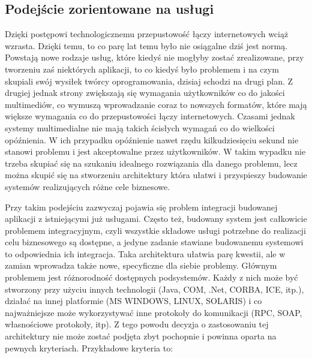 \subsection {Podejście zorientowane na usługi}
Dzięki postępowi technologicznemu przepustowość łączy internetowych wciąż wzrasta. Dzięki temu, to co parę lat temu było nie osiągalne dziś jest normą. Powstają nowe rodzaje usług, które kiedyś nie mogłyby zostać zrealizowane, przy tworzeniu zaś niektórych aplikacji, to co kiedyś było problemem i na czym skupiali swój wysiłek twórcy oprogramowania, dzisiaj schodzi na drugi plan. Z drugiej jednak strony zwiększają się wymagania użytkowników co do jakości multimediów, co wymuszą wprowadzanie coraz to nowszych formatów, które mają większe wymagania co do przepustowości łączy internetowych. Czasami jednak systemy multimedialne nie mają takich ścisłych wymagań co do wielkości opóźnienia. W ich przypadku opóźnienie nawet rzędu kilkudziesięciu sekund nie stanowi problemu i jest akceptowalne przez użytkowników. W takim wypadku nie trzeba skupiać się na szukaniu idealnego rozwiązania dla danego problemu, lecz można skupić się na stworzeniu architektury która ułatwi i przyspieszy budowanie systemów realizujących różne cele biznesowe.

Przy takim podejściu zazwyczaj pojawia się problem integracji budowanej aplikacji z istniejącymi już usługami. Często też, budowany system jest całkowicie problemem integracyjnym, czyli wszystkie składowe usługi potrzebne do realizacji celu biznesowego są dostępne, a jedyne zadanie stawiane budowanemu systemowi to odpowiednia ich integracja. Taka architektura ułatwia parę kwestii, ale w zamian wprowadza także nowe, specyficzne dla siebie problemy. Głównym problemem jest różnorodność dostępnych podsystemów. Każdy z nich może być stworzony przy użyciu innych technologii (Java, COM, .Net, CORBA, ICE, itp.), działać na innej platformie (MS WINDOWS, LINUX, SOLARIS) i co najważniejsze może wykorzystywać inne protokoły do komunikacji (RPC, SOAP, własnościowe protokoły, itp). Z tego powodu decyzja o zastosowaniu tej architektury nie może zostać podjęta zbyt pochopnie i powinna oparta na pewnych kryteriach. Przykładowe kryteria to:  \cite{hohpewoolf2003} 

